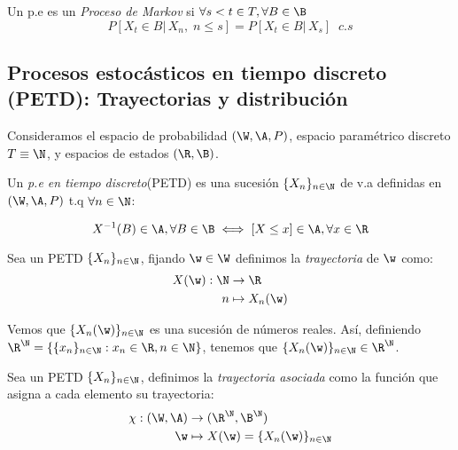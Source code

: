 \begin{ndef}
  Un p.e es un \emph{Proceso de Markov} si  $\forall s<t \in T, \forall B \in \B$ $$P[X_t \in B | \, X_n, \; n \leq s] = P[X_t \in B | \, X_s] \; \; c.s$$
\end{ndef}

\subsection{Procesos estocásticos en tiempo discreto (PETD): Trayectorias y distribución}

Consideramos el espacio de probabilidad $(\W, \A, P)$, espacio paramétrico discreto $T \equiv \N$, y espacios de estados $(\R, \B)$.

\begin{ndef}
  Un \emph{p.e en tiempo discreto}(PETD) es una sucesión $\{X_n\}_{n \in \N}$ de v.a definidas en $(\W, \A, P)$ t.q $\forall n \in \N$:

  $$X^{-1}(B) \in \A, \forall B \in \B \iff [X \leq x] \in \A, \forall x \in \R$$
\end{ndef}

\begin{ndef}
  Sea un PETD $\{X_n\}_{n \in \N}$, fijando $\w \in \W$ definimos la \emph{trayectoria} de $\w$ como:
  \begin{align*}
    X(\w): \N & \to \R \\
    n & \mapsto X_n(\w)
  \end{align*}

\end{ndef}

Vemos que $\{X_n(\w)\}_{n\in\N}$ es una sucesión de números reales. Así, definiendo $\R^\N = \{ \{x_n\}_{n \in \N} : x_n \in \R, n \in \N\}$, tenemos que $\{X_n(\w)\}_{n \in \N} \in \R^\N$.

\begin{ndef}
  Sea un PETD $\{X_n\}_{n \in \N}$, definimos la \emph{trayectoria asociada} como la función que asigna a cada elemento su trayectoria:
  \begin{align*}
    \chi : (\W, \A) & \to (\R^\N, \B^\N) \\
    \w & \mapsto X(\w) = \{X_n(\w)\}_{n \in \N}
  \end{align*}
\end{ndef}
